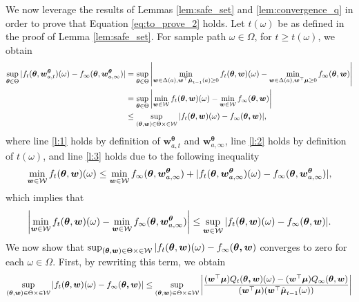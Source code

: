 \documentclass{article}
\begin{document}
\begin{appendices}
We now leverage the results of Lemmas \ref{lem:safe_set} and \ref{lem:convergence_q} in order to prove that Equation \eqref{eq:to_prove_2} holds. Let $t(\omega)$ be as defined in the proof of Lemma \ref{lem:safe_set}. For sample path $\omega \in \Omega$, for $t \geq t(\omega)$, we obtain 
\begin{align}
    \sup_{\boldsymbol\theta \in \Theta} |f_t(\boldsymbol\theta, \boldsymbol{w}_{a,t}^{\boldsymbol{\theta}})(\omega) - f_\infty(\boldsymbol\theta, \boldsymbol{w}_{a,\infty}^{\boldsymbol\theta})| &= \sup_{\boldsymbol\theta \in \Theta} \left|\min_{\boldsymbol{w} \in \Delta(a), \boldsymbol{w}^\top \hat{\boldsymbol\mu}_{t-1}(a) \geq 0} f_t(\boldsymbol\theta, \boldsymbol{w})(\omega) - \min_{\boldsymbol{w} \in \Delta(a), \boldsymbol{w}^\top \boldsymbol{\mu} \geq 0 } f_\infty(\boldsymbol\theta, \boldsymbol{w}) \right| \label{l:1}\\
    &= \sup_{\boldsymbol\theta \in \Theta} \left|\min_{\boldsymbol{w} \in \mathcal{W}} f_t(\boldsymbol\theta, \boldsymbol{w})(\omega) - \min_{\boldsymbol{w} \in \mathcal{W}} f_\infty(\boldsymbol\theta, \boldsymbol{w}) \right|\label{l:2} \\
    &\leq \sup_{(\boldsymbol\theta,\boldsymbol{w}) \in \Theta \times \in \mathcal{W}} |f_t(\boldsymbol{\theta}, \boldsymbol{w})(\omega) - f_\infty(\boldsymbol{\theta, \boldsymbol{w}}) | \label{l:3},
\end{align}
where line \eqref{l:1} holds by definition of $\bm{w}_{a,t}^{\bm\theta}$ and $\bm{w}_{a,\infty}^{\bm\theta}$, line \eqref{l:2} holds by definition of $t(\omega)$, and line \eqref{l:3} holds due to the following inequality
\begin{equation}
    \min_{\boldsymbol{w} \in \mathcal{W}} f_t(\boldsymbol{\theta},\boldsymbol{w})(\omega) \leq \min_{\boldsymbol{w} \in \mathcal{W}}f_\infty(\boldsymbol{\theta}, \boldsymbol{w}_{a,\infty}^{\boldsymbol\theta}) + |f_t(\boldsymbol{\theta}, \boldsymbol{w}_{a,\infty}^{\boldsymbol\theta})(\omega) - f_\infty(\boldsymbol{\theta}, \boldsymbol{w}_{a,\infty}^{\boldsymbol\theta}) |,
\end{equation}
which implies that
\begin{equation}
    \left|\min_{\boldsymbol{w} \in \mathcal{W}} f_t(\boldsymbol{\theta},\boldsymbol{w})(\omega) - \min_{\boldsymbol{w} \in \mathcal{W}}f_\infty(\boldsymbol{\theta}, \boldsymbol{w}_{a,\infty}^{\boldsymbol\theta})\right| \leq \sup_{\boldsymbol{w} \in \mathcal{W}} |f_t(\boldsymbol{\theta}, \boldsymbol{w})(\omega) - f_\infty(\boldsymbol{\theta}, \boldsymbol{w}) |.
\end{equation}
We now show that $\sup_{(\boldsymbol\theta,\boldsymbol{w}) \in \Theta \times \in \mathcal{W}} |f_t(\boldsymbol{\theta}, \boldsymbol{w})(\omega) - f_\infty(\boldsymbol{\theta, \boldsymbol{w}})$ converges to zero for each $\omega \in \Omega$. First, by rewriting this term, we obtain
\begin{align}
    \sup_{(\bm\theta,\bm{w}) \in \Theta \times \in \Wcal} |f_t(\bm{\theta}, \bm{w})(\omega) - f_\infty(\bm{\theta, \bm{w}})| &\leq \sup_{(\bm\theta,\bm{w}) \in \Theta \times \in \Wcal} \left|\frac{(\bm{w}^\top \bm{\mu})Q_t(\bm{\theta, \bm{w}})(\omega) - (\bm{w}^\top\bm{\mu})Q_\infty(\bm{\theta}, \bm{w})}{(\bm{w}^\top\bm{\mu})(\bm{w}^\top\hat{\bm{\mu}}_{t-1}(\omega)) }\right|\\

\end{align}
\end{appendices}
\end{document}
